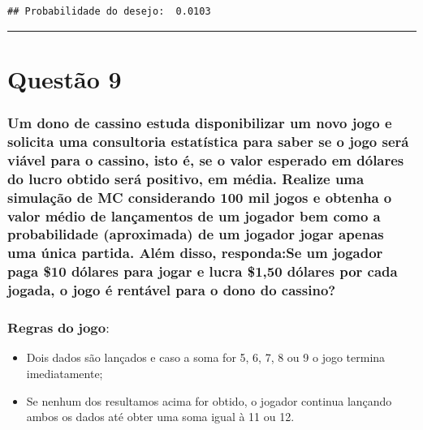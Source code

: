 \documentclass[
]{article}
\providecommand{\tightlist}{%
  \setlength{\itemsep}{0pt}\setlength{\parskip}{0pt}}
\begin{document}
\begin{verbatim}
## Probabilidade do desejo:  0.0103
\end{verbatim}

\begin{center}\rule{0.5\linewidth}{0.5pt}\end{center}

\section{Questão 9}\label{questuxe3o-9}

\subsubsection{Um dono de cassino estuda disponibilizar um novo jogo e
solicita uma consultoria estatística para saber se o jogo será viável
para o cassino, isto é, se o valor esperado em dólares do lucro obtido
será positivo, em média. Realize uma simulação de MC considerando 100
mil jogos e obtenha o valor médio de lançamentos de um jogador bem como
a probabilidade (aproximada) de um jogador jogar apenas uma única
partida. Além disso, responda:Se um jogador paga \$10 dólares para jogar
e lucra \$1,50 dólares por cada jogada, o jogo é rentável para o dono do
cassino?}\label{um-dono-de-cassino-estuda-disponibilizar-um-novo-jogo-e-solicita-uma-consultoria-estatuxedstica-para-saber-se-o-jogo-seruxe1-viuxe1vel-para-o-cassino-isto-uxe9-se-o-valor-esperado-em-duxf3lares-do-lucro-obtido-seruxe1-positivo-em-muxe9dia.-realize-uma-simulauxe7uxe3o-de-mc-considerando-100-mil-jogos-e-obtenha-o-valor-muxe9dio-de-lanuxe7amentos-de-um-jogador-bem-como-a-probabilidade-aproximada-de-um-jogador-jogar-apenas-uma-uxfanica-partida.-aluxe9m-disso-respondase-um-jogador-paga-10-duxf3lares-para-jogar-e-lucra-150-duxf3lares-por-cada-jogada-o-jogo-uxe9-rentuxe1vel-para-o-dono-do-cassino}

\subsubsection{\texorpdfstring{\(\textbf{Regras do jogo: }\)}{\textbackslash textbf\{Regras do jogo: \}}}\label{textbfregras-do-jogo}

\begin{itemize}
\tightlist
\item
  Dois dados são lançados e caso a soma for 5, 6, 7, 8 ou 9 o jogo
  termina imediatamente;
\item
  Se nenhum dos resultamos acima for obtido, o jogador continua lançando
  ambos os dados até obter uma soma igual à 11 ou 12.
\end{itemize}
\end{document}
